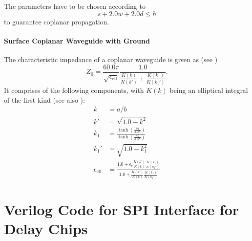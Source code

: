 The parameters have to be chosen according to 
\begin{equation}
	s + 2.0 w + 2.0 d \leq h
\end{equation}
to guarantee coplanar propagation. \cite{wadell}


\paragraph{Surface Coplanar Waveguide with Ground}  
The characteristic impedance of a coplanar waveguide is given as (see \cite{wadell}) 
\begin{equation}
	Z_0 = \frac{60.0 \pi}{\sqrt{\epsilon_\text{eff}}} \frac{1.0}{\frac{K(k)}{K(k')} + \frac{K(k_1)}{K(k_1')}}.
\end{equation}
It comprises of the following components, with $K(k)$ being an elliptical integral of the first kind (see also \cite[p.~430]{bronstein}):
\begin{align}
	k &= a/b\\
	k' &= \sqrt{1.0 - k^{2}}\\
	k_1 &= \frac{\tanh(\frac{\pi a}{4.0  h})}{\tanh(\frac{\pi  b}{4.0 h})}\\
	k_1' &= \sqrt{1.0 - k_1^{2}}\\
	\epsilon_\text{eff} &= \frac{1.0 + \epsilon_r \frac{K(k')}{K(k)} \frac{K(k_1)}{K(k_1')}}{1.0 + \frac{K(k')}{K(k)} \frac{K(k_1)}{K(k_1')}}
\end{align}

\section{Verilog Code for SPI Interface for Delay Chips} \label{app:code} %


